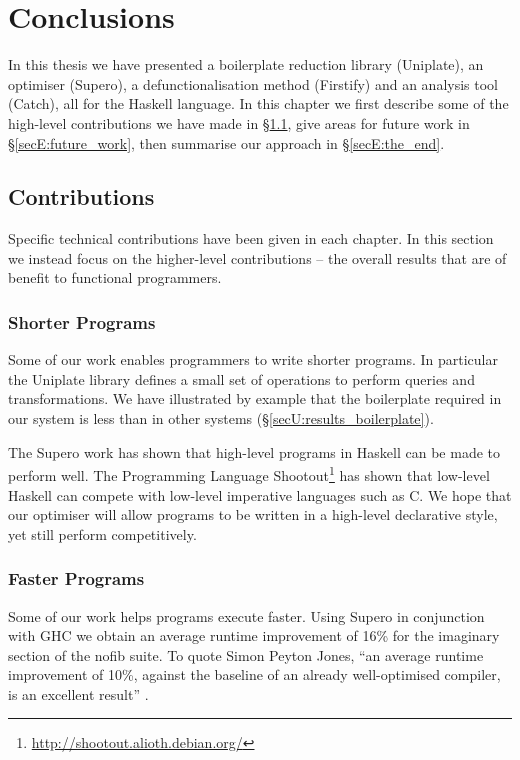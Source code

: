 
\chapter{Conclusions}
\label{chp:conclusions}

In this thesis we have presented a boilerplate reduction library (Uniplate), an optimiser (Supero), a defunctionalisation method (Firstify) and an analysis tool (Catch), all for the Haskell language. In this chapter we first describe some of the high-level contributions we have made in \S\ref{secE:contributions}, give areas for future work in \S\ref{secE:future_work}, then summarise our approach in \S\ref{secE:the_end}.


\section{Contributions}
\label{secE:contributions}

Specific technical contributions have been given in each chapter. In this section we instead focus on the higher-level contributions -- the overall results that are of benefit to functional programmers.

\subsection{Shorter Programs}

Some of our work enables programmers to write shorter programs. In particular the Uniplate library defines a small set of operations to perform queries and transformations. We have illustrated by example that the boilerplate required in our system is less than in other systems (\S\ref{secU:results_boilerplate}).

The Supero work has shown that high-level programs in Haskell can be made to perform well. The Programming Language Shootout\footnote{\url{http://shootout.alioth.debian.org/}} has shown that low-level Haskell can compete with low-level imperative languages such as C. We hope that our optimiser will allow programs to be written in a high-level declarative style, yet still perform competitively.

\subsection{Faster Programs}

Some of our work helps programs execute faster. Using Supero in conjunction with GHC we obtain an average runtime improvement of 16\% for the imaginary section of the nofib suite. To quote Simon Peyton Jones, ``an average runtime improvement of 10\%, against the baseline of an already well-optimised compiler, is an excellent result'' \cite{spj:specconstr}.

